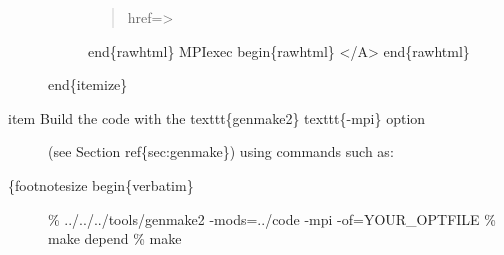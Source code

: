 \documentclass[letterpaper,10pt,english]{sphinxmanual}
\begin{document}
\begin{description}
\begin{description}
\begin{quote}
href=\sphinxquotedblright{}\sphinxquotedblleft{}\textgreater{}
\end{quote}

end\{rawhtml\}
MPIexec
begin\{rawhtml\} \textless{}/A\textgreater{} end\{rawhtml\}

\end{description}

end\{itemize\}

\item[{item Build the code with the texttt\{genmake2\} texttt\{-mpi\} option}] \leavevmode
(see Section ref\{sec:genmake\}) using commands such as:

\item[{\{footnotesize begin\{verbatim\}}] \leavevmode
\%  ../../../tools/genmake2 -mods=../code -mpi -of=YOUR\_OPTFILE
\%  make depend
\%  make

\end{description}
\end{document}
